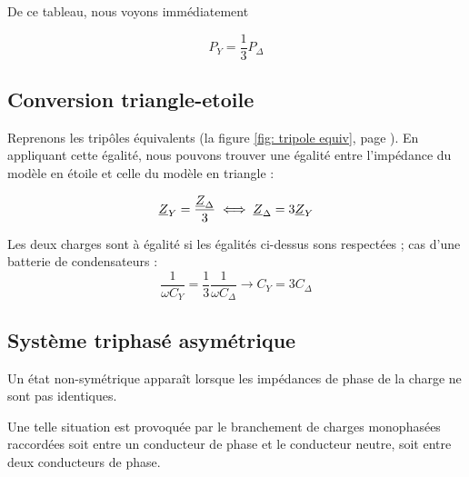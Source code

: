 \documentclass[12pt,a4paper]{article}
\newcommand{\uz}{\uline{Z} }
\begin{document}
De ce tableau, nous voyons immédiatement 
\begin{boite}[0.6]
	\begin{equation}
		P_Y = \frac{1}{3}P_\Delta
	\end{equation}
\end{boite}

\subsection{Conversion triangle-etoile}
Reprenons les tripôles équivalents (la figure \ref{fig: tripole equiv}, page \pageref{fig: tripole equiv}). En appliquant cette égalité, nous pouvons trouver une égalité entre l'impédance du modèle en étoile et celle du modèle en triangle :
\begin{boite}
	\begin{equation}
		\uz_Y = \frac{\uz_\Delta}{3} \iff \uz_\Delta = 3\uz_Y
	\end{equation}
\end{boite}
Les deux charges sont à égalité si les égalités ci-dessus sons respectées ; cas d'une batterie de condensateurs :
\[\frac{1}{\omega C_Y} = \frac{1}{3}\frac{1}{\omega C_\Delta} \to C_Y = 3C_\Delta\]

\subsection{Système triphasé asymétrique}
Un état non-symétrique apparaît lorsque les impédances de phase de la charge ne sont pas identiques. 

Une telle situation est provoquée par le branchement de charges monophasées raccordées soit entre un conducteur de phase et le conducteur neutre, soit entre deux conducteurs de phase. 
\end{document}
